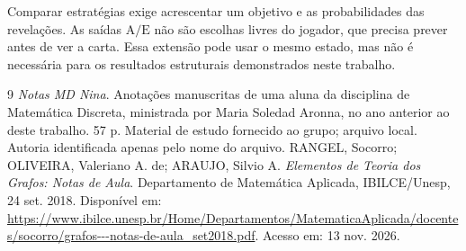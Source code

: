 \documentclass[11pt,a4paper]{article}
\theoremstyle{definition}
\newcommand{\A}{\mathrm{A}}
\newcommand{\Er}{\mathrm{E}}
\begin{document}
Comparar estratégias exige acrescentar um objetivo e as probabilidades das revelações. As saídas $\A/\Er$ não são escolhas livres do jogador, que precisa prever antes de ver a carta. Essa extensão pode usar o mesmo estado, mas não é necessária para os resultados estruturais demonstrados neste trabalho.

\begin{thebibliography}{9}
\small
{} \emph{Notas MD Nina}. Anotações manuscritas de uma aluna da disciplina de Matemática Discreta, ministrada por Maria Soledad Aronna, no ano anterior ao deste trabalho. 57 p. Material de estudo fornecido ao grupo; arquivo local. Autoria identificada apenas pelo nome do arquivo.
 RANGEL, Socorro; OLIVEIRA, Valeriano A. de; ARAUJO, Silvio A. \emph{Elementos de Teoria dos Grafos: Notas de Aula}. Departamento de Matemática Aplicada, IBILCE/Unesp, 24 set. 2018. Disponível em: \url{https://www.ibilce.unesp.br/Home/Departamentos/MatematicaAplicada/docentes/socorro/grafos---notas-de-aula_set2018.pdf}. Acesso em: 13 nov. 2026.
\end{thebibliography}
\end{document}
